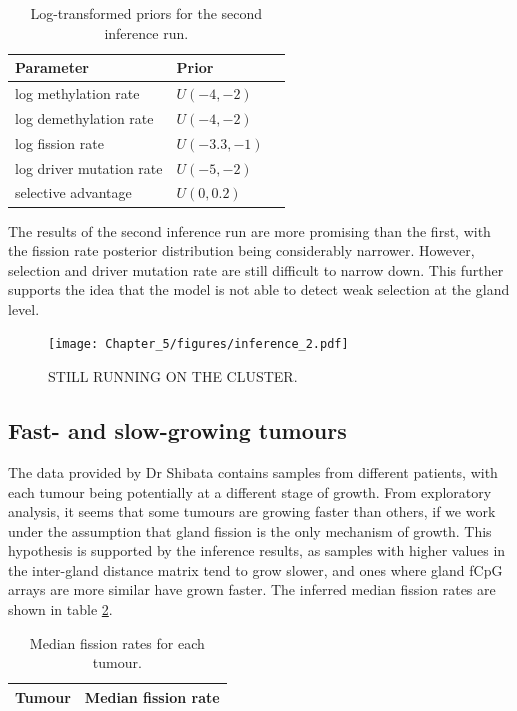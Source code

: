 \begin{table}[ht]
\centering
\begin{tabular}{|l|l|l|}
\hline
Parameter & Prior \\
\hline
log methylation rate & $U(-4, -2)$ \\
log demethylation rate & $U(-4, -2)$\\
log fission rate & $U(-3.3, -1)$\\
log driver mutation rate & $U(-5, -2)$\\
selective advantage & $U(0, 0.2)$\\
\hline
\end{tabular}
\caption{Log-transformed priors for the second inference run.}
\label{tab:inf_ranges_log}
\end{table}

The results of the second inference run are more promising than the first, with
the fission rate posterior distribution being considerably narrower. However,
selection and driver mutation rate are still difficult to narrow down. This
further supports the idea that the model is not able to detect weak selection
at the gland level.

\begin{figure}[h]
    \centering
    \texttt{[image: Chapter\_5/figures/inference\_2.pdf]}
    \caption{STILL RUNNING ON THE CLUSTER.}
    \label{fig:inference_2}
\end{figure}
\clearpage

\subsection{Fast- and slow-growing tumours}
The data provided by Dr Shibata contains samples from different patients, with
each tumour being potentially at a different stage of growth. From exploratory
analysis, it seems that some tumours are growing faster than others, if we work
under the assumption that gland fission is the only mechanism of growth. This
hypothesis is supported by the inference results, as samples with higher values
in the inter-gland distance matrix tend to grow slower, and ones where gland
fCpG arrays are more similar have grown faster. The inferred median fission
rates are shown in table \ref{tab:fission_rates}.
\begin{table}[ht]
\centering
\begin{tabular}{|l|l|}
\hline
Tumour & Median fission rate \\
\hline
\end{tabular}
\caption{Median fission rates for each tumour.}
\label{tab:fission_rates}
\end{table}

